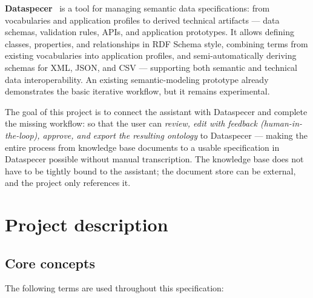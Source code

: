 \documentclass{article}
\begin{document}
\textbf{Dataspecer}~\cite{dataspecer} is a tool for managing semantic data specifications: from vocabularies and application profiles to derived technical artifacts --- data schemas, validation rules, APIs, and application prototypes. It allows defining classes, properties, and relationships in RDF Schema style, combining terms from existing vocabularies into application profiles, and semi-automatically deriving schemas for XML, JSON, and CSV --- supporting both semantic and technical data interoperability.
An existing semantic-modeling prototype already demonstrates the basic iterative workflow, but it remains experimental.

The goal of this project is to connect the assistant with Dataspecer and complete the missing workflow: so that the user can \emph{review, edit with feedback (human-in-the-loop), approve, and export the resulting ontology} to Dataspecer --- making the entire process from knowledge base documents to a usable specification in Dataspecer possible without manual transcription. The knowledge base does not have to be tightly bound to the assistant; the document store can be external, and the project only references it.

\section{Project description}

\subsection{Core concepts}

The following terms are used throughout this specification:
\end{document}
